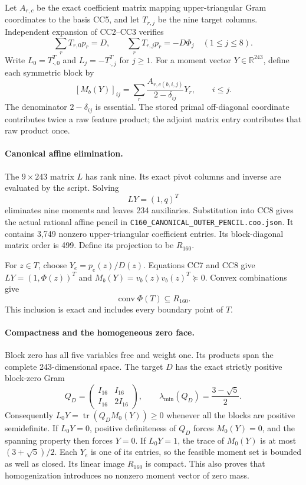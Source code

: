 Let $A_{r,c}$ be the exact coefficient matrix mapping upper-triangular
Gram coordinates to the basis CC5, and let $T_{r,j}$ be the nine target
columns.  Independent expansion of CC2--CC3 verifies
\[
 \sum_r T_{r,0}p_r=D,\qquad
 \sum_r T_{r,j}p_r=-D\Phi_j\quad(1\le j\le8).
\tag{CC7}
\]
Write $L_0=T_{\cdot,0}^{T}$ and $L_j=-T_{\cdot,j}^{T}$ for $j\ge1$.
For a moment vector $Y\in\mathbb R^{243}$, define each symmetric block
by
\[
 [M_b(Y)]_{ij}=\sum_r\frac{A_{r,c(b,i,j)}}{2-\delta_{ij}}Y_r,
 \qquad i\le j.
\tag{CC8}
\]
The denominator $2-\delta_{ij}$ is essential.  The stored primal
off-diagonal coordinate contributes twice a raw feature product;
the adjoint matrix entry contributes that raw product once.

\paragraph{Canonical affine elimination.}
The $9\times243$ matrix $L$ has rank nine.  Its exact pivot columns
and inverse are evaluated by the script.  Solving
\[
 LY=(1,q)^T
\tag{CC9}
\]
eliminates nine moments and leaves 234 auxiliaries.  Substitution into
CC8 gives the actual rational affine pencil in
\nolinkurl{C160_CANONICAL_OUTER_PENCIL.coo.json}.  It contains 3,749
nonzero upper-triangular coefficient entries.  Its block-diagonal
matrix order is 499.  Define its projection to be $R_{160}$.

For $z\in T$, choose $Y_e=p_e(z)/D(z)$.  Equations CC7 and CC8 give
$LY=(1,\Phi(z))^T$ and
$M_b(Y)=v_b(z)v_b(z)^T\succeq0$.  Convex combinations give
\[
 \operatorname{conv}\Phi(T)\subseteq R_{160}.
\tag{CC10}
\]
This inclusion is exact and includes every boundary point of $T$.

\paragraph{Compactness and the homogeneous zero face.}
Block zero has all five variables free and weight one.  Its products
span the complete 243-dimensional space.  The target $D$ has the
exact strictly positive block-zero Gram
\[
 Q_D=\begin{pmatrix}I_{16}&I_{16}\\I_{16}&2I_{16}\end{pmatrix},
 \qquad \lambda_{\min}(Q_D)=\frac{3-\sqrt5}{2}.
\tag{CC11}
\]
Consequently
$L_0Y=\operatorname{tr}(Q_DM_0(Y))\ge0$ whenever all the blocks
are positive semidefinite.  If $L_0Y=0$, positive definiteness of
$Q_D$ forces $M_0(Y)=0$, and the spanning property then forces
$Y=0$.  If $L_0Y=1$, the trace of $M_0(Y)$ is at most
$(3+\sqrt5)/2$.  Each $Y_e$ is one of its entries, so the feasible
moment set is bounded as well as closed.  Its linear image $R_{160}$
is compact.  This also proves that homogenization introduces no
nonzero moment vector of zero mass.

